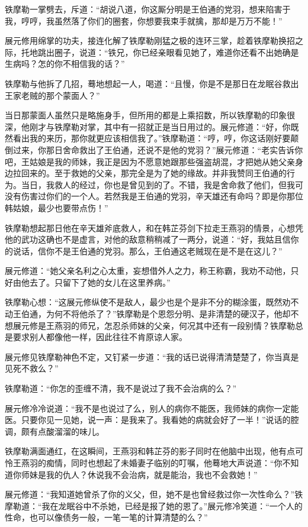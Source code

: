\documentclass[12pt,oneside]{book}
\begin{document}
铁摩勒一掌劈去，斥道：``胡说八道，你这厮分明是王伯通的党羽，想来陷害于我，哼哼，我虽然落了你们的圈套，你想要我束手就擒，那却是万万不能！''

展元修用绵掌的功夫，接连化解了铁摩勒刚猛之极的连环三掌，趁着铁摩勒换招之际，托地跳出圈子，说道：``铁兄，你已经亲眼看见她了，难道你还看不出她确是生病吗？怎的你不相信我的话？''

铁摩勒与他拆了几招，蓦地想起一人，喝道：``且慢，你是不是那日在龙眠谷救出王家老贼的那个蒙面人？''

当日那蒙面人虽然只是略施身手，但所用的都是上乘招数，所以铁摩勒的印象很深，他刚才与铁摩勒对掌，其中有一招就正是当日用过的。展元修道：``好，你既然看出我的来历，那你就更应该相信我了。''铁摩勒道：``哼，哼，你这话刚好要颠倒过来，你那日舍命救出了王伯通，还说不是他的党羽？''展元修道：``老实告诉你吧，王姑娘是我的师妹，我正是因为不愿意她跟那些强盗胡混，才把她从她父亲身边拉回来的。至于救她的父亲，那完全是为了她的缘故。并非我赞同王伯通的行为。当日，我救人的经过，你也是曾见到的了。不错，我是舍命救了他们，但我可没有伤害过你们的一个人。若然我是王伯通的党羽，辛天雄还有命吗？即是你那位韩姑娘，最少也要带点伤！''

铁摩勒想起那日他在辛天雄斧底救人，和在韩芷芬剑下拉走王燕羽的情景，心想凭他的武功这确也不是虚言，对他的敌意稍稍减了一两分，说道：``好，我姑且信你的说话，信你不是王伯通的党羽。那么，王伯通这老贼现在是不是在这儿？''

展元修道：``她父亲名利之心太重，妄想借外人之力，称王称霸，我劝不动他，只好由他去了。只留下了她的女儿在这里养病。''

铁摩勒心想：``这展元修纵使不是敌人，最少也是个是非不分的糊涂蛋，既然劝不动王伯通，为何不将他杀了？''铁摩勒是个恩怨分明、是非清楚的硬汉子，他却不想展元修是王燕羽的师兄，怎忍杀师妹的父亲，何况其中还有一段别情？铁摩勒总是要求别人都像他一样，因此往往不肯原谅人家。

展元修见铁摩勒神色不定，又钉紧一步道：``我的话已说得清清楚楚了，你当真是见死不救么？''

铁摩勒道：``你怎的歪缠不清，我不是说过了我不会治病的么？''

展元修冷冷说道：``我不是也说过了么，别人的病你不能医，我师妹的病你一定能医。只要你见一见她，说一声：是我来了。我看她的病就会好了一半！''说话的腔调，颇有点酸溜溜的味儿。

铁摩勒满面通红，在这瞬间，王燕羽和韩芷芬的影子同时在他脑中出现，他有点可怜王燕羽的痴情，同时也想起了未婚妻子临别的叮嘱，他蓦地大声说道：``你不知道你师妹是我的仇人？休说我不会治病，就是能治，我也不会救她！''

展元修道：``我知道她曾杀了你的义父，但，她不是也曾经救过你一次性命么？''铁摩勒道：``我在龙眠谷中不杀她，已经是报了她的恩了。''展元修冷笑道：``一个人的性命，也可以像债务一般，一笔一笔的计算清楚的么？''
\end{document}
